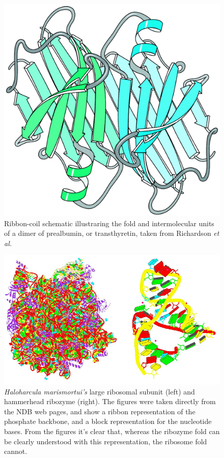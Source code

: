 \begin{figure}[ht]
\centering
\includegraphics[scale=0.4]{Chapter1/overallfold.png}
\caption{Ribbon-coil schematic illustraring the fold and
  intermolecular units of a dimer of prealbumin, or
transthyretin, taken from Richardson \textit{et al.} \cite{richardson2002}}
\end{figure}

\begin{figure}[t]
\centering
\includegraphics[scale=0.5]{Chapter1/ribosome_ribozyme.png}
\caption{\textit{Haloharcula marismortui's} large ribosomal subunit
(left) and hammerhead ribozyme (right).%
 The figures were taken
directly from the NDB web pages, and show a ribbon
representation of the phosphate backbone, and a block representation
for the nucleotide bases. From the figures it's clear that, whereas the
ribozyme fold can be clearly understood with this representation, the
ribosome fold cannot.}
\end{figure}

